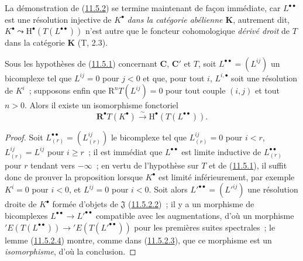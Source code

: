 \begin{env}[11.5.2.5]
\label{0.11.5.2.5-fr}
La démonstration de (\hyperref[0.11.5.2-fr]{11.5.2}) se termine maintenant de
façon immédiate, car $L^{\bullet\bullet}$ est une résolution injective de
$K^\bullet$ \emph{dans la catégorie abélienne $\boldsymbol{K}$}, autrement dit,
$K^\bullet\leadsto\mathrm H^\bullet(T(L^{\bullet\bullet}))$ n'est autre que
le foncteur cohomologique \emph{dérivé droit} de $T$ dans la catégorie $\boldsymbol{K}$
(T, 2.3).
\end{env}

\begin{proposition}[11.5.3]
\label{0.11.5.3-fr}
Sous les hypothèses de \textup{(\hyperref[0.11.5.1-fr]{11.5.1})} concernant
$\boldsymbol{C}$, $\boldsymbol{C}'$ et $T$, soit
$L^{\bullet\bullet}=(L^{ij})$ un bicomplexe tel que $L^{ij}=0$ pour $j<0$ et
que, pour tout $i$, $L^{i,\bullet}$ soit une résolution de $K^i$~; supposons
enfin que $\mathrm R^nT(L^{ij})=0$ pour tout couple $(i,j)$ et tout $n>0$.
Alors il existe un isomorphisme fonctoriel
\[
  \label{0.11.5.3.1-fr}
  \mathbf R^\bullet T(K^\bullet)\xrightarrow{\sim}
  \mathrm H^\bullet(T(L^{\bullet\bullet})).
  \tag{11.5.3.1}
\]
\end{proposition}

\begin{proof}
Soit $L_{(r)}^{\bullet\bullet}=(L_{(r)}^{ij})$ le bicomplexe tel que
$L_{(r)}^{ij}=0$ pour $i<r$, $L_{(r)}^{ij}=L^{ij}$ pour $i\geq r$~; il est
immédiat que $L^{\bullet\bullet}$ est limite inductive de
$L_{(r)}^{\bullet\bullet}$ pour $r$ tendant vers $-\infty$~; en vertu de
l'hypothèse sur $T$ et de (\hyperref[0.11.5.1-fr]{11.5.1}), il suffit donc de
prouver la proposition lorsque $K^\bullet$ est limité inférieurement, par
exemple $K^i=0$ pour $i<0$, et $L^{ij}=0$ pour $i<0$. Soit alors
$L'^{\bullet\bullet}=(L'^{ij})$ une résolution droite de $K^\bullet$ formée
d'objets de $\mathfrak J$ (\hyperref[0.11.5.2.2-fr]{11.5.2.2})~; il y a un
morphisme de bicomplexes
$L^{\bullet\bullet}\to L'^{\bullet\bullet}$ compatible avec les
augmentations, d'où un morphisme
$'E(T(L^{\bullet\bullet}))\to{}'E(T(L'^{\bullet\bullet}))$ pour les premières
suites spectrales~; le lemme (\hyperref[0.11.5.2.4-fr]{11.5.2.4}) montre,
comme dans (\hyperref[0.11.5.2.3-fr]{11.5.2.3}), que ce morphisme est un
\emph{isomorphisme}, d'où la conclusion.
\end{proof}

